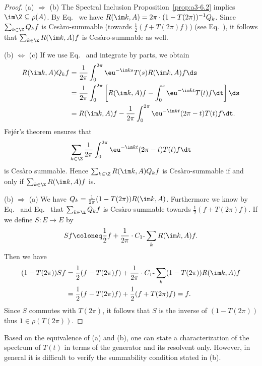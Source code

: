 \begin{proof}
(a) $\Rightarrow$ (b) The Spectral Inclusion Proposition~\ref{prop:a3-6.2} implies $\im\Z \subseteq \rho(A)$.
By Eq.~ we have $R(\im k,A) = 2\pi\cdot(1-T(2\pi))^{-1}Q_{k}$.
Since $\sum_{k\in\Z} Q_{k}f$ is Cesàro-summable (\mbox{towards} $\frac{1}{2}(f + T(2\pi)f)$) (see Eq.~), it follows that $\sum_{k\in\Z} R(\im k,A)f$ is Cesàro-summable as well.

(b) $\Leftrightarrow$ (c) If we use Eq.~ and integrate by parts, we obtain
\begin{align*}
R(\im k,A)Q_{k}f &= \frac{1}{2\pi}\int_{0}^{2\pi} \eu^{-\im ks} T(s)R(\im k,A)f \ds \\
&= \frac{1}{2\pi}\int_{0}^{2\pi} \left[R(\im k,A)f - \int_{0}^{s} \eu^{-\im kt} T(t)f \dt\right] \ds \\
&= R(\im k,A)f - \frac{1}{2\pi}\int_{0}^{2\pi} \eu^{-\im kt} (2\pi-t) T(t)f \dt .
\end{align*}
Fejér's theorem ensures that 
%
\[
	 \sum_{k\in\Z} \frac{1}{2\pi}\int_{0}^{2\pi} \eu^{-\im kt} (2\pi-t) T(t)f \dt 
\]
%
is Cesàro summable.
Hence $\sum_{k\in\Z} R(\im k,A)Q_{k}f$ is Cesàro-summable if and only if\/ $\sum_{k\in\Z} R(\im k,A)f$ is.

(b) $\Rightarrow$ (a) We have $Q_{k} = \frac{1}{2\pi}(1 - T(2\pi))R(\im k,A)$.
Furthermore we know by Eq.~ and Eq.~  that $\sum_{k\in\Z} Q_{k}f$ is Cesàro-summable towards $\frac{1}{2}(f + T(2\pi)f)$.
If we define $S \colon E \to E$ by 
%
\[
	Sf \coloneq \frac{1}{2}f + \frac{1}{2\pi}\cdot C_{1}\text{-}\sum_k R(\im k,A)f .
\]
%
Then we have
\begin{align*}
(1 - T(2\pi))Sf &= \frac{1}{2}(f - T(2\pi)f) + \frac{1}{2\pi}\cdot C_{1}\text{-}\sum_k (1 - T(2\pi))R(\im k,A)f \\
&= \frac{1}{2}(f - T(2\pi)f) + \frac{1}{2}(f + T(2\pi)f) = f .
\end{align*}
Since $S$ commutes with $T(2\pi)$, it follows that $S$ is the inverse of\/ $(1 - T(2\pi))$ thus $1 \in \rho(T(2\pi))$.
\end{proof}
Based on the equivalence of (a) and (b), one can state a characterization of the spectrum of\/ $T(t)$ in terms of the generator and its resolvent only.
However, in general it is difficult to verify the summability condition stated in (b).

